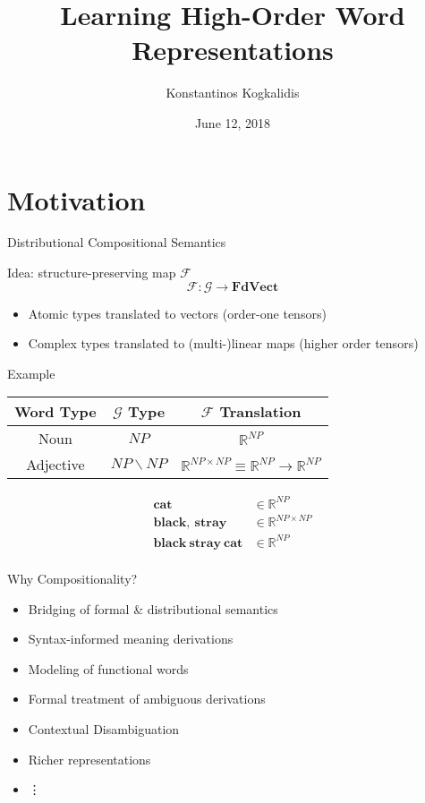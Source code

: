 \documentclass{beamer}
\title{Learning High-Order Word Representations}
\date{June 12, 2018}
\author{Konstantinos Kogkalidis}
\institute{LoLa Fan Club}
\begin{document}
  \maketitle
 
\section{Motivation}
\begin{frame}{Distributional Compositional Semantics}

	Idea: structure-preserving map $\mathcal{F}$
	\[
	\mathcal{F}: \mathcal{G} \to \pmb{FdVect} 
	\]
	
	\begin{itemize}	
	\item Atomic types translated to vectors (order-one tensors)
	\item Complex types translated to (multi-)linear maps (higher order tensors)
	\end{itemize}
\end{frame}

\begin{frame}{Example}
\centering

	\vspace{40pt}
	\begin{tabular}{c|c|c}
	\toprule
	Word Type & $\mathcal{G}$ Type & $\mathcal{F}$ Translation\\
	\midrule
	Noun & $NP$ & $\mathbb{R}^{NP}$ \\ 
	Adjective & $NP \backslash NP$ & $\mathbb{R}^{NP \times NP} \equiv \mathbb{R}^{NP} \to \mathbb{R}^{NP}$\\
	\end{tabular}
	
	\vspace{20pt}
	\begin{align*}
	\pmb{cat} & \in \mathbb{R}^{NP}\\
	\pmb{black},\ \pmb{stray} & \in \mathbb{R}^{NP \times NP}\\
	\pmb{black\ stray\ cat} & \in \mathbb{R}^{NP}\\
	\end{align*}	
	
\end{frame}
  
\begin{frame}{Why Compositionality?}
	\begin{itemize}
	\item Bridging of formal \& distributional semantics
	\item Syntax-informed meaning derivations
	\item Modeling of functional words
	\item Formal treatment of ambiguous derivations
	\item Contextual Disambiguation
	\item Richer representations
	\item[] \quad \vdots
	\end{itemize}
\end{frame}
\end{document}
